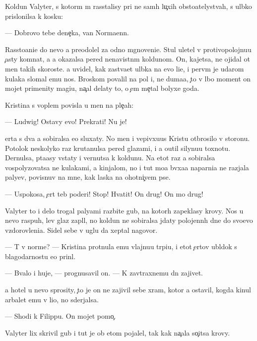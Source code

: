 \documentclass[10pt]{book}
\begin{document}
Koldun Valyter, s kotor{\yi}m m{\yi} rasstalisy pri ne sam{\yi}h lu{\c}xih obsto{\y}atelystvah, s ul{\yi}bko{\y} prislonilsa k kos{\ia}ku:

— Dobrovo tebe dene{\c}ka, van Norma{\y}enn.

Rassto{\y}ani{\y}e do nevo {\y}a preodolel za odno mgnoveni{\y}e. Stul uletel v protivopolojnu{\y}u {\c}asty komnat{\yi}, a {\y}a okazalsa pered nenavistn{\yi}m koldunom. On, kajetsa, ne ojidal ot men{\ia} takih skoroste{\y}. {\Y}a uvidel, kak zast{\yi}va{\y}et ul{\yi}bka na {\y}evo li{\q}e, i perv{\yi}m je udarom kulaka slomal {\y}emu nos. Broskom povalil na pol i, ne duma{\y}a, {\c}to v l{\iu}bo{\y} moment on mojet primenity magi{\y}u, na{\c}al delaty to, o {\c}em me{\c}tal bolyxe goda.

Kristina s voplem povisla u men{\ia} na ple{\c}ah:

— Ludwig! Ostavy {\y}evo! Prekrati! Nu je!

{\C}erta s dva {\y}a sobiralsa {\y}e{\y}o sluxaty. No men{\ia} i v{\q}epivxu{\y}us{\ia} Kristu otbrosilo v storonu. Potolok neskolyko raz krutanulsa pered glazami, i {\y}a o{\x}util silynu{\y}u toxnotu. Dernulsa, p{\yi}ta{\y}asy vstaty i vernutsa k koldunu. Na etot raz {\y}a sobiralsa vospolyzovatsa ne kulakami, a kinjalom, no i tut mo{\y}a b{\yi}vxa{\y}a naparni{\q}a ne razjala paly{\q}ev, povisnuv na mne, kak laska na ohotni{\c}yem pse.

— Uspoko{\y}sa, {\c}ert teb{\ia} poderi! Stop! Hvatit! On drug! On mo{\y} drug!



Valyter to i delo trogal paly{\q}ami razbit{\yi}{\y}e gub{\yi}, na kotor{\yi}h zapeklasy krovy. Nos u nevo raspuh, lev{\yi}{\y} glaz zapl{\yi}l, no koldun ne sobiralsa jdaty polojenn{\yi}h dne{\y} do svo{\y}evo v{\yi}zdorovleni{\y}a. Sidel sebe v uglu da xeptal nagovor{\yi}.

— T{\yi} v norme? — Kristina prot{\ia}nula {\y}emu vlajnu{\y}u tr{\ia}pi{\q}u, i etot {\c}ertov ubl{\iu}dok s blagodarnost{\y}u {\y}e{\y}o prin{\ia}l.

— B{\yi}valo i huje, — prognusavil on. — K zavtraxnemu dn{\iu} zajivet.

{\Y}a hotel u nevo sprosity, {\c}to je on ne zajivil sebe xram, kotor{\yi}{\y} {\y}a ostavil, kogda kinul arbalet {\y}emu v li{\q}o, no sderjalsa.

— Shodi k Filippu. On mojet pomo{\c}.

Valyter lix skrivil gub{\yi} i tut je ob etom pojalel, tak kak na{\c}ala so{\c}itsa krovy.
\end{document}
